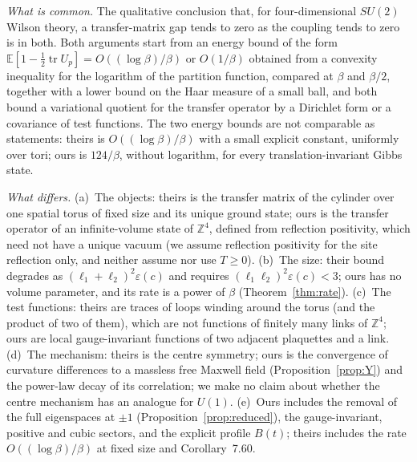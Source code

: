 \documentclass[11pt,a4paper]{article}
\theoremstyle{plain}
\theoremstyle{definition}
\theoremstyle{remark}
\numberwithin{equation}{section}
\newcommand{\Z}{\mathbb{Z}}
\newcommand{\E}{\mathbb{E}}
\newcommand{\tr}{\operatorname{tr}}
\begin{document}
\emph{What is common.} The qualitative conclusion that, for four-dimensional $SU(2)$ Wilson theory, a transfer-matrix gap tends to zero as the
coupling tends to zero is in both. Both arguments start from an energy bound of the form $\E[1-\tfrac12\tr U_p]=O((\log\beta)/\beta)$ or $O(1/\beta)$ obtained from a convexity inequality for
the logarithm of the partition function, compared at $\beta$ and $\beta/2$, together with a lower bound on the Haar measure of a small ball, and both bound a variational
quotient for the transfer operator by a Dirichlet form or a covariance of test functions. The two energy bounds are not comparable as statements: theirs is $O((\log\beta)/\beta)$ with a small explicit constant, uniformly over tori; ours is $124/\beta$, without logarithm, for every translation-invariant Gibbs state.

\emph{What differs.} (a)~The objects: theirs is the transfer matrix of the cylinder over one spatial torus of fixed size and its unique ground state; ours is the
transfer operator of an infinite-volume state of $\Z^4$, defined from reflection positivity, which need not have a unique vacuum (we assume reflection positivity for the site reflection only, and neither assume nor use $T\ge0$).
(b)~The size: their bound degrades as $(\ell_1+\ell_2)^2\varepsilon(c)$ and requires $(\ell_1\ell_2)^2\varepsilon(c)<3$; ours has no volume parameter, and its rate is a power of $\beta$ (Theorem~\ref{thm:rate}). (c)~The test functions: theirs are traces of loops winding around the torus (and the product of two of them), which are not functions of finitely many
links of $\Z^4$; ours are local gauge-invariant functions of two adjacent plaquettes and a link. (d)~The mechanism: theirs is the centre symmetry; ours is the
convergence of curvature differences to a massless free Maxwell field (Proposition~\ref{prop:Y}) and the power-law decay of its correlation; we make no claim about whether the centre mechanism has an analogue for $U(1)$. (e)~Ours includes the removal of the full eigenspaces at $\pm1$ (Proposition~\ref{prop:reduced}), the
gauge-invariant, positive and cubic sectors, and the explicit profile $B(t)$; theirs includes the rate $O((\log\beta)/\beta)$ at fixed size and Corollary~7.60.
\end{document}
